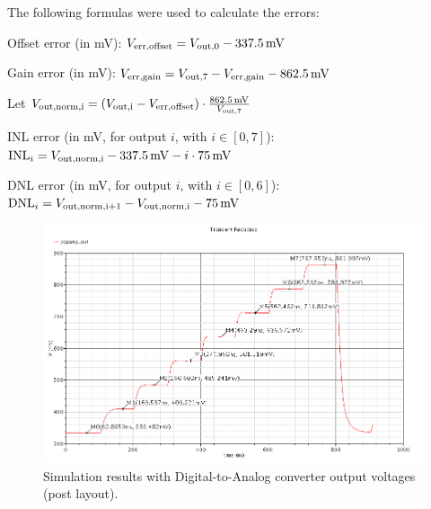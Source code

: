 \documentclass[parskip,oneside,colorbacktitle,10pt,accentcolor=tud1b,table]{tudreport}
\begin{document}
{The following formulas were used to calculate the errors:

Offset error (in mV): $V_\text{err,offset} = V_\text{out,0} - \unit[337.5]{mV}$

Gain error (in mV): $V_\text{err,gain} = V_\text{out,7} - V_\text{err,gain} - \unit[862.5]{mV}$

Let $V_\text{out,norm,i} = \left( V_\text{out,i} - V_\text{err,offset} \right) \cdot \frac{\unit[862.5]{mV}}{V_\text{out,7}}$

INL error (in mV, for output $i$, with $i \in \left[ 0, 7 \right]$): $\text{INL}_i =  V_\text{out,norm,i} - \unit[337.5]{mV} - i \cdot \unit[75]{mV}$

DNL error (in mV, for output $i$, with $i \in \left[ 0, 6 \right]$): $\text{DNL}_i =  V_\text{out,norm,i+1} - V_\text{out,norm,i} - \unit[75]{mV}$

\begin{figure}[H]
	\begin{center}
		\includegraphics[width=\linewidth]{dac_out}
		 \caption{Simulation results with Digital-to-Analog converter output voltages (post layout).}
		 \label{fig:dac_out}
	\end{center}
\end{figure}

}
\end{document}
